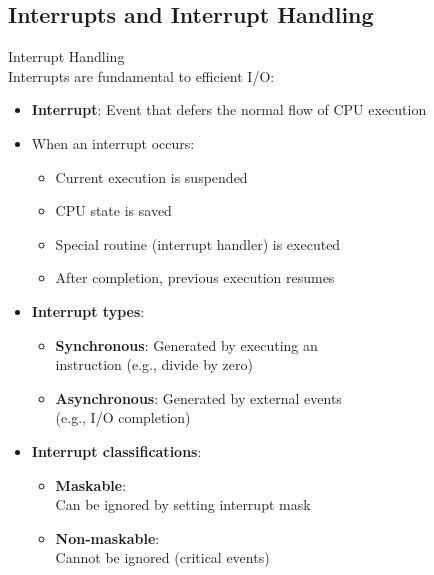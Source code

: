 \columnbreak

\subsection{Interrupts and Interrupt Handling}


\begin{definition}{Interrupt Handling}\\
    Interrupts are fundamental to efficient I/O:
    \begin{itemize}
        \item \textbf{Interrupt}: Event that defers the normal flow of CPU execution
        \item When an interrupt occurs:
            \begin{itemize}
                \item Current execution is suspended
                \item CPU state is saved
                \item Special routine (interrupt handler) is executed
                \item After completion, previous execution resumes
            \end{itemize}
        \item \textbf{Interrupt types}:
            \begin{itemize}
                \item \textbf{Synchronous}: Generated by executing an \\ instruction (e.g., divide by zero)
                \item \textbf{Asynchronous}: Generated by external events \\ (e.g., I/O completion)
            \end{itemize}
        \item \textbf{Interrupt classifications}:
            \begin{itemize}
                \item \textbf{Maskable}: \\ Can be ignored by setting interrupt mask
                \item \textbf{Non-maskable}: \\ Cannot be ignored (critical events)
            \end{itemize}
    \end{itemize}
\end{definition}

